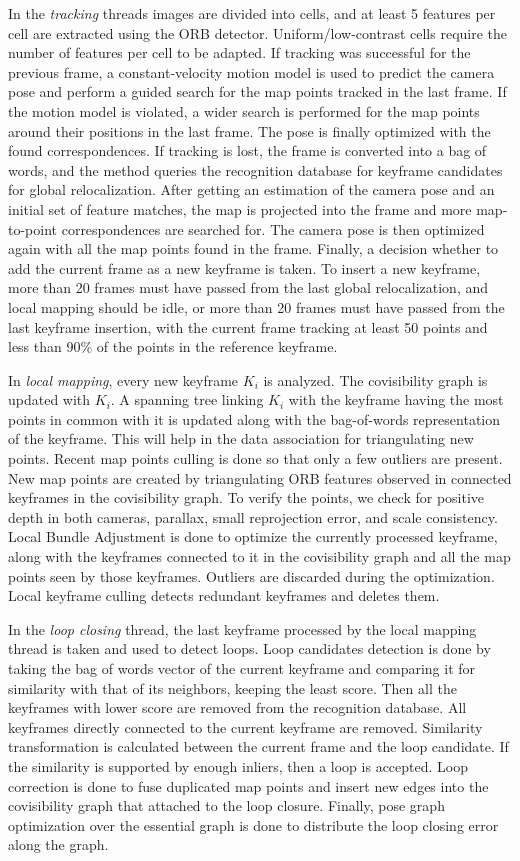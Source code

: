 In the \textit{tracking} threads images are divided into cells, and at least 5 features per cell are extracted using the ORB detector. Uniform/low-contrast cells require the number of features per cell to be adapted. If tracking was successful for the previous frame, a constant-velocity motion model is used to predict the camera pose and perform a guided search for the map points tracked in the last frame. If the motion model is violated, a wider search is performed for the map points around their positions in the last frame. The pose is finally optimized with the found correspondences. If tracking is lost, the frame is converted into a bag of words, and the method queries the recognition database for keyframe candidates for global relocalization. After getting an estimation of the camera pose and an initial set of feature matches, the map is projected into the frame and more map-to-point correspondences are searched for. The camera pose is then optimized again with all the map points found in the frame. Finally, a decision whether to add the current frame as a new keyframe is taken. To insert a new keyframe, more than 20 frames must have passed from the last global relocalization, and local mapping should be idle, or more than 20 frames must have passed from the last keyframe insertion, with the current frame tracking at least 50 points and less than 90\% of the points in the reference keyframe.

In \textit{local mapping}, every new keyframe $K_i$ is analyzed. The covisibility graph is updated with $K_i$. A spanning tree linking $K_i$ with the keyframe having the most points in common with it is updated along with the bag-of-words representation of the keyframe. This will help in the data association for triangulating new points. Recent map points culling is done so that only a few outliers are present. New map points are created by triangulating ORB features observed in connected keyframes in the covisibility graph. To verify the points, we check for positive depth in both cameras, parallax, small reprojection error, and scale consistency. Local Bundle Adjustment is done to optimize the currently processed keyframe, along with the keyframes connected to it in the covisibility graph and all the map points seen by those keyframes. Outliers are discarded during the optimization. Local keyframe culling detects redundant keyframes and deletes them.

In the \textit{loop closing} thread, the last keyframe processed by the local mapping thread is taken and used to detect loops. Loop candidates detection is done by taking the bag of words vector of the current keyframe and comparing it for similarity with that of its neighbors, keeping the least score. Then all the keyframes with lower score are removed from the recognition database. All keyframes directly connected to the current keyframe are removed. Similarity transformation is calculated between the current frame and the loop candidate. If the similarity is supported by enough inliers, then a loop is accepted. Loop correction is done to fuse duplicated map points and insert new edges into the covisibility graph that attached to the loop closure. Finally, pose graph optimization over the essential graph is done to distribute the loop closing error along the graph. 


